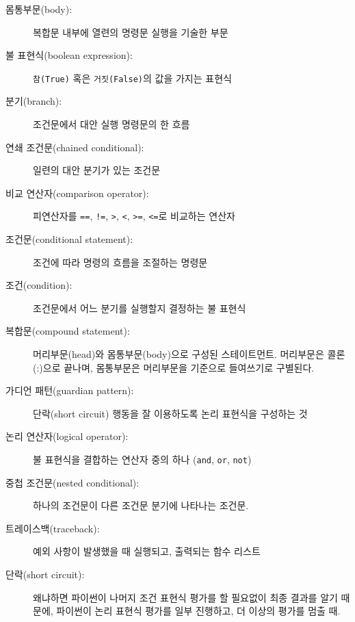 \begin{description}

\item[몸통부문(body):] 복합문 내부에 열련의 명령문 실행을 기술한 부문

\item[불 표현식(boolean expression):] {\tt 참(True)} 혹은 {\tt 거짓(False)}의 값을 가지는 표현식

\item[분기(branch):] 조건문에서 대안 실행 명령문의 한 흐름

\item[연쇄 조건문(chained conditional):] 일련의 대안 분기가 있는 조건문

\item[비교 연산자(comparison operator):] 피연산자를 {\tt ==}, {\tt !=}, {\tt >}, {\tt <}, {\tt >=}, {\tt <=}로 비교하는 연산자

\item[조건문(conditional statement):] 조건에 따라 명령의 흐름을 조절하는 명령문


\item[조건(condition):] 조건문에서 어느 분기를 실행할지 결정하는 불 표현식

\item[복합문(compound statement):] 머리부문(head)와 몸통부문(body)으로 구성된 스테이트먼트.
머리부문은 콜론(:)으로 끝나며, 몸통부문은 머리부문을 기준으로 들여쓰기로 구별된다.

\item[가디언 패턴(guardian pattern):] 
단락(short circuit) 행동을 잘 이용하도록 논리 표현식을 구성하는 것

\item[논리 연산자(logical operator):] 불 표현식을 결합하는 연산자 중의 하나 ({\tt and}, {\tt or}, {\tt not})

\item[중첩 조건문(nested conditional):] 
하나의 조건문이 다른 조건문 분기에 나타나는 조건문.

\item[트레이스백(traceback):] 예외 사항이 발생했을 때 실행되고, 출력되는 함수 리스트

\item[단락(short circuit):]
왜냐하면 파이썬이 나머지 조건 표현식 평가를 할 필요없이 최종 결과를 알기 때문에,
파이썬이 논리 표현식 평가를 일부 진행하고, 더 이상의 평가를 멈출 때.


\end{description}

